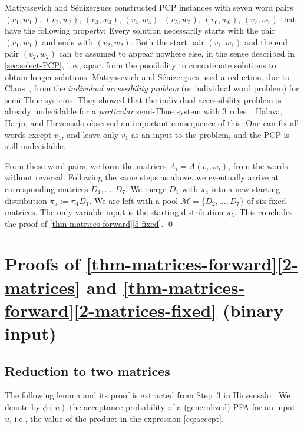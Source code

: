 \documentclass[a4paper,cleveref, autoref, thm-restate]{lipics-v2021}
\newcommand\clausEATCS{claus80-Bull-EATCS-anonymous}
\newcommand\clausEATCS{claus80-Bull-EATCS}
\begin{document}
 Matiyasevich and S{\'e}nizergues \cite{matiyasevich2005decision}
 constructed PCP instances with seven word pairs
 $(v_1,w_1),\,\allowbreak(v_2,w_2),\,(v_3,w_3),\,(v_4,w_4),\,(v_5,w_5),
 \,(v_6,w_6),
 \,(v_7,w_7)$
that have the following property:
Every solution necessarily starts with the pair
$(v_1,w_1)$ and ends with
$(v_2,w_2)$.
Both the start pair $(v_1,w_1)$ and the end pair $(v_2,w_2)$ can
be assumed to appear nowhere else,
in the sense described in \autoref{sec:select-PCP}, i.\,e.,
apart from the possibility to concatenate solutions to obtain
longer solutions.
Matiyasevich and S{\'e}nizergues \cite
{matiyasevich2005decision}
used a reduction,
 due to
 Claus~\cite{\clausEATCS},
from
the \emph{individual accessibility problem} %
(or individual word problem)
for semi-Thue systems.
They showed that
the individual accessibility problem
is already undecidable for 
a \emph{particular} semi-Thue system with 3 rules~\cite[Theorem~3]{matiyasevich2005decision}.
Halava, Harju, and Hirvensalo
\cite[Theorem~6]{halava07-Claus-instances}
observed an important consequence of  this:
One can fix all words except $v_1$, and leave only
$v_1$ as an input to the problem, and the PCP is still undecidable.

From these word pairs,
we form the matrices
$A_i=A(v_i,w_i)$,
from the words
without reversal.
Following the same steps as above, we
eventually arrive at corresponding matrices $D_1,\ldots,D_7$.
 We merge
$D_1$ with $\pi_4$ into
a new starting distribution
$  \pi_5 :=
\pi_4D_{1}$.
We are left with a pool $\mathcal{M}=\{D_2,\ldots,D_7\}$ of
six fixed
matrices. The only variable input is the
starting distribution
$  \pi_5$.
This concludes the 
proof of \autoref{thm-matrices-forward}\ref{5-fixed}.
\qed




\section{Proofs of \autoref{thm-matrices-forward}\ref{2-matrices}
and \autoref{thm-matrices-forward}\ref{2-matrices-fixed}
  (binary input)}
\label{sec:two-matrices}

\subsection{Reduction to two matrices} %
\label{sec:reduce-to-2}

The following lemma and its proof is extracted from Step~3 in
Hirvensalo \cite[Section~3]{hirvensalo07}.
We denote by
$\phi(u)$ the acceptance probability of a (generalized) PFA for
an input $u$, i.e., the value of the product in the expression
\eqref{eq:accept}.
\end{document}
